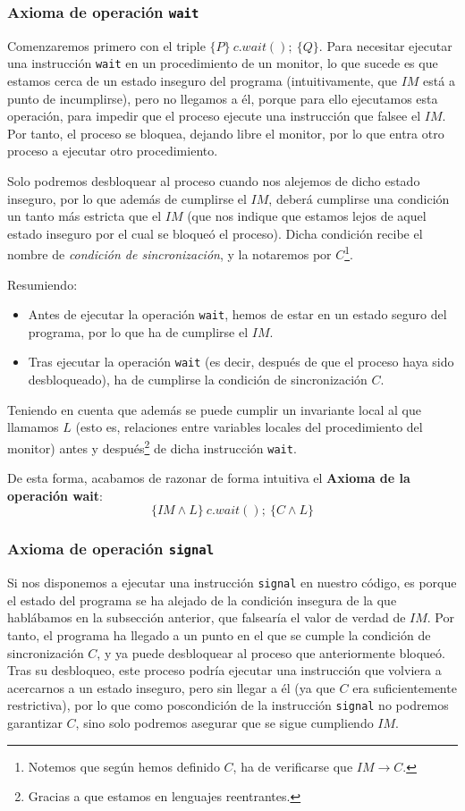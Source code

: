 \subsubsection{Axioma de operación \texttt{wait}}
Comenzaremos primero con el triple $\{P\}\ c.wait();\ \{Q\}$. Para necesitar ejecutar una instrucción \verb|wait| en un procedimiento de un monitor, lo que sucede es que estamos cerca de un estado inseguro del programa (intuitivamente, que $IM$ está a punto de incumplirse), pero no llegamos a él, porque para ello ejecutamos esta operación, para impedir que el proceso ejecute una instrucción que falsee el $IM$. Por tanto, el proceso se bloquea, dejando libre el monitor, por lo que entra otro proceso a ejecutar otro procedimiento. 

Solo podremos desbloquear al proceso cuando nos alejemos de dicho estado inseguro, por lo que además de cumplirse el $IM$, deberá cumplirse una condición un tanto más estricta que el $IM$ (que nos indique que estamos lejos de aquel estado inseguro por el cual se bloqueó el proceso). Dicha condición recibe el nombre de \textit{condición de sincronización}, y la notaremos por $C$\footnote{Notemos que según hemos definido $C$, ha de verificarse que $IM\rightarrow C$.}. 

Resumiendo:
\begin{itemize}
    \item Antes de ejecutar la operación \verb|wait|, hemos de estar en un estado seguro del programa, por lo que ha de cumplirse el $IM$.
    \item Tras ejecutar la operación \verb|wait| (es decir, después de que el proceso haya sido desbloqueado), ha de cumplirse la condición de sincronización $C$.
\end{itemize}
Teniendo en cuenta que además se puede cumplir un invariante local al que llamamos $L$ (esto es, relaciones entre variables locales del procedimiento del monitor) antes y después\footnote{Gracias a que estamos en lenguajes reentrantes.} de dicha instrucción \verb|wait|.

De esta forma, acabamos de razonar de forma intuitiva el \textbf{Axioma de la operación wait}:
\begin{equation*}
    \{IM \land L\}\ c.wait();\ \{C \land L\}
\end{equation*}

\subsubsection{Axioma de operación \texttt{signal}}
Si nos disponemos a ejecutar una instrucción \verb|signal| en nuestro código, es porque el estado del programa se ha alejado de la condición insegura de la que hablábamos en la subsección anterior, que falsearía el valor de verdad de $IM$. Por tanto, el programa ha llegado a un punto en el que se cumple la condición de sincronización $C$, y ya puede desbloquear al proceso que anteriormente bloqueó. Tras su desbloqueo, este proceso podría ejecutar una instrucción que volviera a acercarnos a un estado inseguro, pero sin llegar a él (ya que $C$ era suficientemente restrictiva), por lo que como poscondición de la instrucción \verb|signal| no podremos garantizar $C$, sino solo podremos asegurar que se sigue cumpliendo $IM$.


